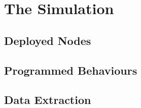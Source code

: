 \section{The Simulation}

\subsection{Deployed Nodes}

\subsection{Programmed Behaviours}

\subsection{Data Extraction}